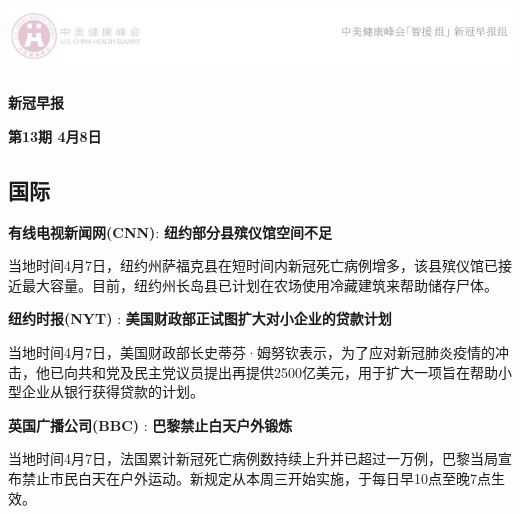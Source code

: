 \documentclass[
]{article}
\author{}
\date{\vspace{-2.5em}}
\begin{document}
\fontsize{22}{22}
\selectfont
\vspace{-10truemm}

\newcommand{\resheading}[1]{%
  \noindent\fcolorbox{lavenderblush}{lavenderblush}{\makebox[\dimexpr\textwidth-2\fboxsep-2\fboxrule][l]{\textbf{~#1}}}%
}

\begin{center}
\includegraphics[height=2cm]{./input/logo2.png} 
\end{center}

\begin{center}
\fontsize{45}{45}
\textcolor{glaucous}{\textbf{新冠早报}}
\end{center}

\begin{center}
\fontsize{22}{22}
{\textcolor{glaucous}{\textbf{第13期 \space 4月8日}}}
\end{center}

%
  \noindent{}%

\hypertarget{section}{%
\subsection{\texorpdfstring{\textcolor{glaucous}{\Huge 国际}}{}}\label{section}}

\textbf{\textcolor{glaucous}{有线电视新闻网(CNN)}}:
\textbf{纽约部分县殡仪馆空间不足}

当地时间4月7日，纽约州萨福克县在短时间内新冠死亡病例增多，该县殡仪馆已接近最大容量。目前，纽约州长岛县已计划在农场使用冷藏建筑来帮助储存尸体。

\textbf{\textcolor{glaucous}{纽约时报(NYT)}} :
\textbf{美国财政部正试图扩大对小企业的贷款计划}

当地时间4月7日，美国财政部长史蒂芬·姆努钦表示，为了应对新冠肺炎疫情的冲击，他已向共和党及民主党议员提出再提供2500亿美元，用于扩大一项旨在帮助小型企业从银行获得贷款的计划。

\textbf{\textcolor{glaucous}{英国广播公司(BBC)}} :
\textbf{巴黎禁止白天户外锻炼}

当地时间4月7日，法国累计新冠死亡病例数持续上升并已超过一万例，巴黎当局宣布禁止市民白天在户外运动。新规定从本周三开始实施，于每日早10点至晚7点生效。
\end{document}
